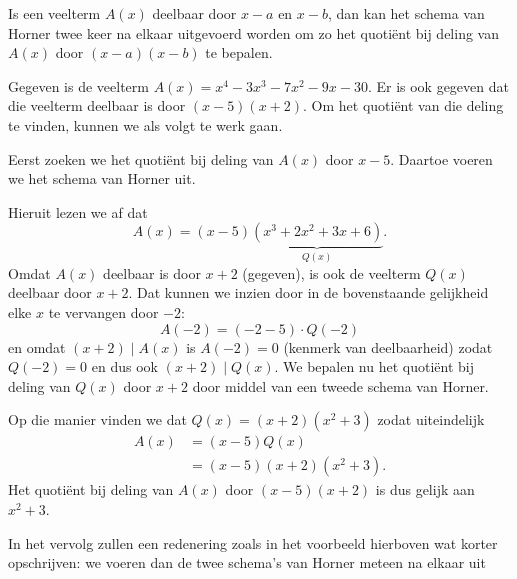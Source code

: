 \documentclass{ximera}
\begin{document}
Is een veelterm $A(x)$ deelbaar door $x-a$ en $x-b$, dan kan het schema van Horner twee keer na elkaar uitgevoerd worden om zo het quotiënt bij deling van $A(x)$ door $(x-a)(x-b)$ te bepalen. 

\begin{example} 
Gegeven is de veelterm $A(x) = x^4 - 3x^3 - 7x^2 - 9 x - 30$. Er is ook gegeven dat die veelterm deelbaar is door $(x-5)(x+2)$. Om het quotiënt van die deling te vinden, kunnen we als volgt te werk gaan.

Eerst zoeken we het quotiënt bij deling van $A(x)$ door $x-5$. Daartoe voeren we het schema van Horner uit.
\renewcommand{\kolbreed}{\widthof{$-30$}}



Hieruit lezen we af dat
\[
A(x) = (x-5)\underbrace{(x^3 + 2x^2 + 3x + 6)}_{Q(x)}.
\] 
Omdat $A(x)$ deelbaar is door $x+2$ (gegeven), is ook de veelterm $Q(x)$ deelbaar door $x+2$. Dat kunnen we inzien door in de bovenstaande gelijkheid elke $x$ te vervangen door $-2$:
\[
A(-2) = (-2-5)\cdot Q(-2)
\]
en omdat $(x+2) \mid A(x)$ is $A(-2) = 0$ (kenmerk van deelbaarheid) zodat $Q(-2) = 0$ en dus ook $(x+2) \mid Q(x)$. We bepalen nu het quotiënt bij deling van $Q(x)$ door $x+2$ door middel van een tweede schema van Horner.
\renewcommand{\kolbreed}{\widthof{$-6$}}



Op die manier vinden we dat $Q(x) = (x+2)(x^2+3)$ zodat uiteindelijk
\begin{align*}
A(x) 
& = (x-5)Q(x) \\
& = (x-5)(x+2)(x^2+3).
\end{align*}
Het quotiënt bij deling van $A(x)$ door $(x-5)(x+2)$ is dus gelijk aan $x^2+3$. 
\end{example} 


In het vervolg zullen een redenering zoals in het voorbeeld hierboven wat korter opschrijven: we voeren dan de twee schema's van Horner meteen na elkaar uit
\renewcommand{\kolbreed}{\widthof{$-30$}}
\end{document}

